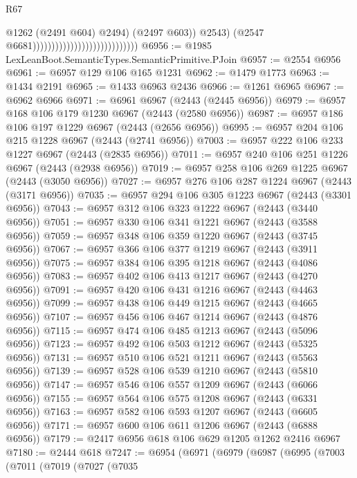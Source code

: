 \begin{lexlean}{R67}
\begin{coremodule}
                                                                @1262
                                                                (@2491 @604)
                                                                @2494)
                                                              (@2497 @603))
                                                            @2543)
                                                          (@2547 @6681))))))))))))))))))))))))))))
@6956 := @1985 LexLeanBoot.SemanticTypes.SemanticPrimitive.PJoin
@6957 := @2554 @6956
@6961 := @6957 @129 @106 @165 @1231
@6962 := @1479 @1773
@6963 := @1434 @2191
@6965 := @1433 @6963 @2436
@6966 := @1261 @6965
@6967 := @6962 @6966
@6971 := @6961 @6967 (@2443 (@2445 @6956))
@6979 := @6957 @168 @106 @179 @1230 @6967 (@2443 (@2580 @6956))
@6987 := @6957 @186 @106 @197 @1229 @6967 (@2443 (@2656 @6956))
@6995 := @6957 @204 @106 @215 @1228 @6967 (@2443 (@2741 @6956))
@7003 := @6957 @222 @106 @233 @1227 @6967 (@2443 (@2835 @6956))
@7011 := @6957 @240 @106 @251 @1226 @6967 (@2443 (@2938 @6956))
@7019 := @6957 @258 @106 @269 @1225 @6967 (@2443 (@3050 @6956))
@7027 := @6957 @276 @106 @287 @1224 @6967 (@2443 (@3171 @6956))
@7035 := @6957 @294 @106 @305 @1223 @6967 (@2443 (@3301 @6956))
@7043 := @6957 @312 @106 @323 @1222 @6967 (@2443 (@3440 @6956))
@7051 := @6957 @330 @106 @341 @1221 @6967 (@2443 (@3588 @6956))
@7059 := @6957 @348 @106 @359 @1220 @6967 (@2443 (@3745 @6956))
@7067 := @6957 @366 @106 @377 @1219 @6967 (@2443 (@3911 @6956))
@7075 := @6957 @384 @106 @395 @1218 @6967 (@2443 (@4086 @6956))
@7083 := @6957 @402 @106 @413 @1217 @6967 (@2443 (@4270 @6956))
@7091 := @6957 @420 @106 @431 @1216 @6967 (@2443 (@4463 @6956))
@7099 := @6957 @438 @106 @449 @1215 @6967 (@2443 (@4665 @6956))
@7107 := @6957 @456 @106 @467 @1214 @6967 (@2443 (@4876 @6956))
@7115 := @6957 @474 @106 @485 @1213 @6967 (@2443 (@5096 @6956))
@7123 := @6957 @492 @106 @503 @1212 @6967 (@2443 (@5325 @6956))
@7131 := @6957 @510 @106 @521 @1211 @6967 (@2443 (@5563 @6956))
@7139 := @6957 @528 @106 @539 @1210 @6967 (@2443 (@5810 @6956))
@7147 := @6957 @546 @106 @557 @1209 @6967 (@2443 (@6066 @6956))
@7155 := @6957 @564 @106 @575 @1208 @6967 (@2443 (@6331 @6956))
@7163 := @6957 @582 @106 @593 @1207 @6967 (@2443 (@6605 @6956))
@7171 := @6957 @600 @106 @611 @1206 @6967 (@2443 (@6888 @6956))
@7179 := @2417 @6956 @618 @106 @629 @1205 @1262 @2416 @6967
@7180 := @2444 @618
@7247 := @6954
    (@6971
      (@6979
        (@6987
          (@6995
            (@7003
              (@7011
                (@7019
                  (@7027
                    (@7035

\end{coremodule}
\end{lexlean}
